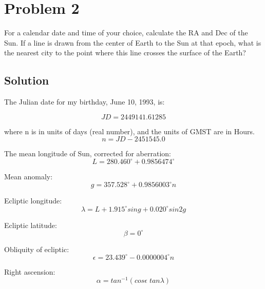 \documentclass[conf]{new-aiaa}
\begin{document}
\newpage 
\section*{Problem 2}

For a calendar date and time of your choice, calculate the RA and Dec of the Sun. If a line is
drawn from the center of Earth to the Sun at that epoch, what is the nearest city to the point
where this line crosses the surface of the Earth?

\subsection{Solution}

The Julian date for my birthday, June 10, 1993, is: 

\begin{equation}
	JD = 2449141.61285 
\end{equation}

where n is in units of days (real number), and the units of GMST are in Hours. 
\begin{equation}
	n = JD - 2451545.0 
\end{equation}

The mean longitude of Sun, corrected for aberration: 
\begin{equation}
	L = 280.460^\circ + 0.9856474^\circ 
\end{equation}

Mean anomaly: 
\begin{equation}
	g = 357.528 ^\circ + 0.9856003 ^\circ n 
\end{equation}

Ecliptic longitude: 
\begin{equation}
	\lambda = L + 1.915 ^\circ sin g + 0.020 ^\circ sin 2g 
\end{equation}

Ecliptic latitude: 
\begin{equation}
	\beta = 0 ^\circ
\end{equation}

Obliquity of ecliptic: 
\begin{equation}
	\epsilon = 23.439 ^\circ - 0.0000004 ^\circ n 
\end{equation}

Right ascension: 
\begin{equation}
	\alpha = tan^{-1} (cos \epsilon \; tan \lambda)
\end{equation}
\end{document}
